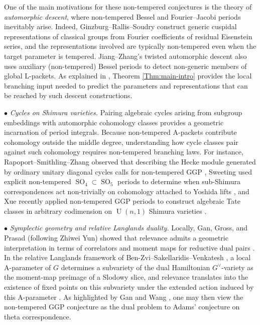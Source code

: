 \documentclass[11pt,letterpaper]{amsart}
\theoremstyle{plain}
\numberwithin{theorem}{section}
\numberwithin{equation}{subsection}
\theoremstyle{remark}
\newcommand{\SO}{\operatorname{SO}}
\newcommand{\U}{\operatorname{U}}
\begin{document}
\vskip 5pt

One of the main motivations for these non-tempered conjectures is the theory of \emph{automorphic descent}, where non-tempered Bessel and Fourier--Jacobi periods inevitably arise. Indeed, Ginzburg--Rallis--Soudry \cite{GRS11} construct generic cuspidal representations of classical groups from Fourier coefficients of residual Eisenstein series, and the representations involved are typically non-tempered even when the target parameter is tempered. Jiang--Zhang's twisted automorphic descent \cite{JZ20} also uses auxiliary (non-tempered) Bessel periods to detect non-generic members of global L-packets. As explained in \cite[Sect. 12]{MR4190046}, Theorem \ref{Thm:main-intro} provides the local branching input needed to predict the parameters and representations that can be reached by such descent constructions.

\vskip 5pt

$\bullet$ \textit{Cycles on Shimura varieties.}
Pairing algebraic cycles arising from subgroup embeddings with automorphic cohomology classes provides a geometric incarnation of period integrals. Because non-tempered A-packets contribute cohomology outside the middle degree, understanding how cycle classes pair against such cohomology requires non-tempered branching laws. For instance, Rapoport--Smithling--Zhang observed that describing the Hecke module generated by ordinary unitary diagonal cycles calls for non-tempered GGP \cite[Rmk. 6.16]{RSZ20}, Sweeting used explicit non-tempered $\SO_4 \subset \SO_5$ periods to determine when sub-Shimura correspondences act non-trivially on cohomology attached to Yoshida lifts \cite[Thm. A \& C]{Swe22}, and Xue recently applied non-tempered GGP periods to construct algebraic Tate classes in arbitrary codimension on $\U(n,1)$ Shimura varieties \cite{Xue26}.

\vskip 5pt

$\bullet$ \textit{Symplectic geometry and relative Langlands duality.}
Locally, Gan, Gross, and Prasad (following Zhiwei Yun) showed that relevance admits a geometric interpretation in terms of correlators and moment maps for reductive dual pairs \cite[Sect. 4]{MR4190046}. In the relative Langlands framework of Ben-Zvi--Sakellaridis--Venkatesh \cite{bzsv}, a local A-parameter of $G$ determines a subvariety of the dual Hamiltonian $G^\vee$-variety as the moment-map preimage of a Slodowy slice, and relevance translates into the existence of fixed points on this subvariety under the extended action induced by this A-parameter \cite[Sect. 14.3]{bzsv}. As highlighted by Gan and Wang \cite{gw25}, one may then view the non-tempered GGP conjecture as the dual problem to Adams' conjecture on theta correspondence.%
\end{document}
